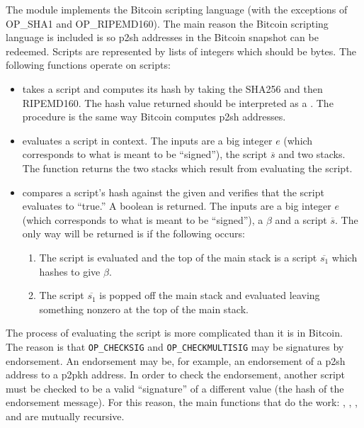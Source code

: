 The module {} implements the Bitcoin scripting language
(with the exceptions of OP\_SHA1 and OP\_RIPEMD160).
The main reason the Bitcoin scripting language is included is so p2sh
addresses in the Bitcoin snapshot can be redeemed.
Scripts are represented by lists of integers which should be bytes.
The following functions operate on scripts:
\begin{itemize}
\item {} takes a script and computes its hash by
taking the SHA256 and then RIPEMD160.
The hash value returned should be interpreted as a {}.
The procedure is the same way Bitcoin computes p2sh addresses.
\item {}
evaluates a script in context.
The inputs are a big integer $e$ (which corresponds to what is meant to be ``signed''),
the script $\overline{s}$ and two stacks.
The function returns the two stacks which result from evaluating the script.
\item {}
compares a script's hash against the given {}
and verifies that the script evaluates to ``true.''
A boolean is returned.
The inputs are a big integer $e$ (which corresponds to what is meant to be ``signed''),
a {} $\beta$ and a script $\overline{s}$.
The only way {} will be returned is if the following occurs:
\begin{enumerate}
\item The script is evaluated and the top of the main stack is a script $\overline{s_1}$ which hashes to give $\beta$.
\item The script $\overline{s_1}$ is popped off the main stack and evaluated leaving something nonzero at the top of the main stack.
\end{enumerate}
\end{itemize}
The process of evaluating the script is more complicated than it is in Bitcoin.
The reason is that {\tt{OP\_CHECKSIG}} and {\tt{OP\_CHECKMULTISIG}} may be signatures
by endorsement. An endorsement may be, for example, an endorsement of a p2sh address
to a p2pkh address. In order to check the endorsement, another script must be checked
to be a valid ``signature'' of a different value (the hash of the endorsement message).
For this reason, the main functions that do the work: {},
{},
{},
{} and 
{}
are mutually recursive.

